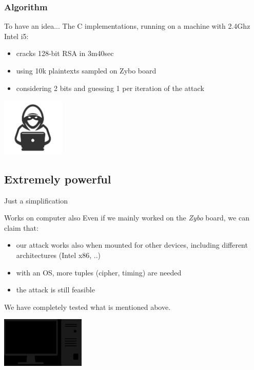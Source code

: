 \documentclass{beamer}
\begin{document}
\begin{frame}[fragile]
    \frametitle{Algorithm}
    \begin{block}{To have an idea...}
        The C implementations, running on a machine with 2.4Ghz Intel i5:
        \begin{itemize}
            \pause \item cracks 128-bit RSA in 3m40sec
            \pause \item using 10k plaintexts sampled on Zybo board
            \pause \item considering 2 bits and guessing 1 per iteration of the attack
        \end{itemize}
    \end{block}
    \hfill \includegraphics[width=3cm]{./graphics/hacker}
\end{frame}

\subsection{Extremely powerful}
\begin{frame}{Just a simplification}
	\begin{block}{Works on computer also}
		Even if we mainly worked on the \textit{Zybo} board, we can claim that:
		\begin{itemize}
			\pause \item our attack works also when mounted for other devices, including different architectures (Intel x86, ..)
			\pause \item with an  OS, more tuples (cipher, timing) are needed
			\pause \item the attack is still feasible
		\end{itemize}
    We have completely tested what is mentioned above.
    \begin{center}
      \includegraphics[width=4cm]{./graphics/pc}
    \end{center}
	\end{block}
\end{frame}
\end{document}
